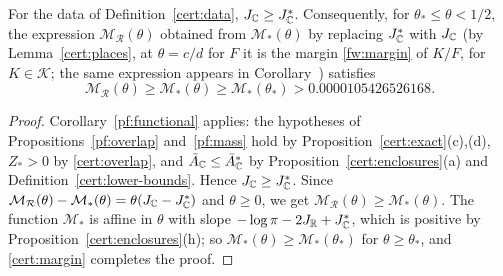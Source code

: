 \begin{lemma}\label{cert:lower-margin}
For the data of Definition~\ref{cert:data}, $J_\mathbb C\ge J_\mathbb C^*$.
Consequently, for $\theta_*\le\theta<1/2$, the expression
$\mathcal M_{\mathcal R}(\theta)$ obtained from $\mathcal M_*(\theta)$ by
replacing $J_\mathbb C^*$ with $J_\mathbb C$ (by Lemma~\ref{cert:places}, at $\theta=c/d$
for $F$ it is the margin \eqref{fw:margin} of $K/F$, for $K\in\mathcal K$;
the same expression appears in Corollary~) satisfies
\[
 \mathcal M_{\mathcal R}(\theta)\ge\mathcal M_*(\theta)\ge\mathcal
 M_*(\theta_*)>0.0000105426526168 .
\]
\end{lemma}

\begin{proof}
Corollary~\ref{pf:functional} applies: the hypotheses of
Propositions~\ref{pf:overlap} and~\ref{pf:mass} hold by
Proposition~\ref{cert:exact}(c),(d), $Z_*>0$ by \eqref{cert:overlap},
and $\bar A_\mathbb C\le\bar A_\mathbb C^*$ by Proposition~\ref{cert:enclosures}(a) and
Definition~\ref{cert:lower-bounds}. Hence $J_\mathbb C\ge J_\mathbb C^*$. Since
$\mathcal M_{\mathcal R}(\theta)-\mathcal M_*(\theta)=\theta(J_\mathbb C-J_\mathbb C^*)$
and $\theta\ge0$, we get $\mathcal M_{\mathcal R}(\theta)\ge\mathcal
M_*(\theta)$. The function $\mathcal M_*$ is affine in $\theta$ with slope
$-\log\pi-2J_\mathbb R+J_\mathbb C^*$, which is positive by
Proposition~\ref{cert:enclosures}(h); so $\mathcal M_*(\theta)\ge\mathcal
M_*(\theta_*)$ for $\theta\ge\theta_*$, and \eqref{cert:margin} completes the
proof.
\end{proof}

